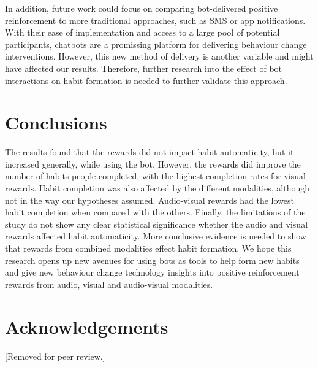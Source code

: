 \documentclass{scaffold/sigchi}
\begin{document}
In addition, future work could focus on comparing bot-delivered positive reinforcement to more traditional approaches, such as SMS or app notifications. With their ease of implementation and access to a large pool of potential participants, chatbots are a promissing platform for delivering behaviour change interventions. However, this new method of delivery is another variable and might have affected our results. Therefore, further research into the effect of bot interactions on habit formation is needed to further validate this approach.   

\section{Conclusions}
The results found that the rewards did not impact habit automaticity, but it increased generally, while using the bot. However, the rewards did improve the number of habits people completed, with the highest completion rates for visual rewards. Habit completion was also affected by the different modalities, although not in the way our hypotheses assumed. Audio-visual rewards had the lowest habit completion when compared with the others. Finally, the limitations of the study do not show any clear statistical significance whether the audio and visual rewards affected habit automaticity. More conclusive evidence is needed to show that rewards from combined modalities effect habit formation. We hope this research opens up new avenues for using bots as tools to help form new habits and give new behaviour change technology insights into positive reinforcement rewards from audio, visual and audio-visual modalities.



\section{Acknowledgements}
[Removed for peer review.]


\balance{}


% 
% 
\printbibliography
\end{document}
